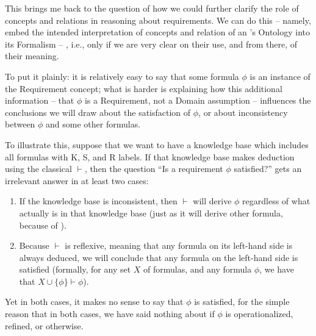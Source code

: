 \documentclass[10pt, final, conference, compsocconf]{IEEEtran}
\begin{document}
This brings me back to the question of how we could further clarify the role of concepts and relations in reasoning about requirements. We can do this -- namely, embed the intended interpretation of concepts and relation of an 's Ontology into its Formalism -- , i.e., only if we are very clear on their use, and from there, of their meaning. 

To put it plainly: it is relatively easy to say that some formula $\phi$ is an instance of the Requirement concept; what is harder is explaining how this additional information -- that $\phi$ is a Requirement, not a Domain assumption -- influences the conclusions we will draw about the satisfaction of $\phi$, or about inconsistency between $\phi$ and some other formulas. 

To illustrate this, suppose that we want to have a knowledge base which includes all formulas with K, S, and R labels. If that knowledge base makes deduction using the classical $\vdash$, then the question ``Is a requirement $\phi$ satisfied?'' gets an irrelevant answer in at least two cases:
\begin{enumerate}
\item{If the knowledge base is inconsistent, then $\vdash$ will derive $\phi$ regardless of what actually is in that knowledge base (just as it will derive  other formula, because of ).}
\item{Because $\vdash$ is reflexive, meaning that any formula on its left-hand side is always deduced, we will conclude that any formula on the left-hand side is satisfied (formally, for any set $X$ of formulas, and any formula $\phi$, we have that $X \cup \{ \phi \} \vdash \phi$).}
\end{enumerate}

Yet in both cases, it makes no sense to say that $\phi$ is satisfied, for the simple reason that in both cases, we have said nothing about if $\phi$ is operationalized, refined, or otherwise.
\end{document}
